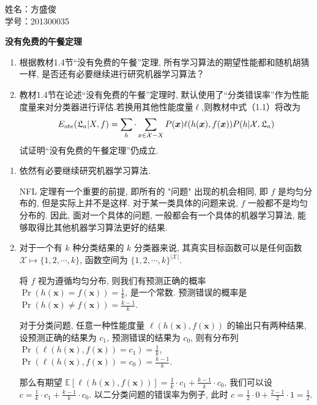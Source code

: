 \documentclass[answers]{exam}  %
\begin{document}
\Large
\noindent
姓名：方盛俊 \\
学号：201300035 \\
\begin{questions}
  \question [20] \textbf{没有免费的午餐定理}

  \begin{enumerate}
    \item 根据教材1.4节“没有免费的午餐”定理, 所有学习算法的期望性能都和随机胡猜一样, 是否还有必要继续进行研究机器学习算法？
    \item 教材1.4节在论述“没有免费的午餐”定理时, 默认使用了“分类错误率”作为性能度量来对分类器进行评估.若换用其他性能度量$\ell$,则教材中式（1.1）将改为
          \begin{equation}
            E_{ote}(\mathfrak{L}_a|X,f)=\sum_h \cdot\sum_{x\in\mathcal{X}-X}P({\boldsymbol{x}})\ell(h({\boldsymbol{x}}),f({\boldsymbol{x}}))P(h|\mathcal{X},\mathfrak{L}_a)
          \end{equation}
          试证明“没有免费的午餐定理”仍成立.
  \end{enumerate}
  \begin{solution}
    \begin{enumerate}
      \item 依然有必要继续研究机器学习算法.

            NFL 定理有一个重要的前提, 即所有的 "问题" 出现的机会相同, 即 $f$ 是均匀分布的, 但是实际上并不是这样. 对于某一类具体的问题来说, $f$ 一般都不是均匀分布的. 因此, 面对一个具体的问题, 一般都会有一个具体的机器学习算法, 能够取得比其他机器学习算法更好的结果.

      \item 对于一个有 $k$ 种分类结果的 $k$ 分类器来说, 其真实目标函数可以是任何函数 $\mathcal{X}\mapsto \{ 1,2,\cdots ,k \}$, 函数空间为 $\{ 1,2,\cdots ,k \}^{|\mathcal{X}|}$.

            将 $f$ 视为遵循均匀分布, 则我们有预测正确的概率 $\displaystyle \operatorname{Pr}(h(\bm{x})=f(\bm{x}))=\frac{1}{k}$, 是一个常数. 预测错误的概率是 $\displaystyle \operatorname{Pr}(h(\bm{x})\neq f(\bm{x}))=\frac{k-1}{k}$.

            对于分类问题, 任意一种性能度量 $\ell(h(\bm{x}), f(\bm{x}))$ 的输出只有两种结果, 设预测正确的结果为 $c_1$, 预测错误的结果为 $c_0$, 则有分布列 $\displaystyle \operatorname{Pr}(\ell(h(\bm{x}), f(\bm{x}))=c_1) = \frac{1}{k}$, $\displaystyle \operatorname{Pr}(\ell(h(\bm{x}), f(\bm{x}))=c_0) = \frac{k-1}{k}$.

            那么有期望 $\displaystyle \mathbb{E}[\ell(h(\bm{x}), f(\bm{x}))] = \frac{1}{k}\cdot c_1+\frac{k-1}{k}\cdot c_0$, 我们可以设 $\displaystyle c=\frac{1}{k}\cdot c_1+\frac{k-1}{k}\cdot c_0$. 以二分类问题的错误率为例子, 此时 $\displaystyle c = \frac{1}{2}\cdot 0 + \frac{2-1}{2}\cdot 1 = \frac{1}{2}$.


\end{enumerate}
\end{solution}
\end{questions}
\end{document}
